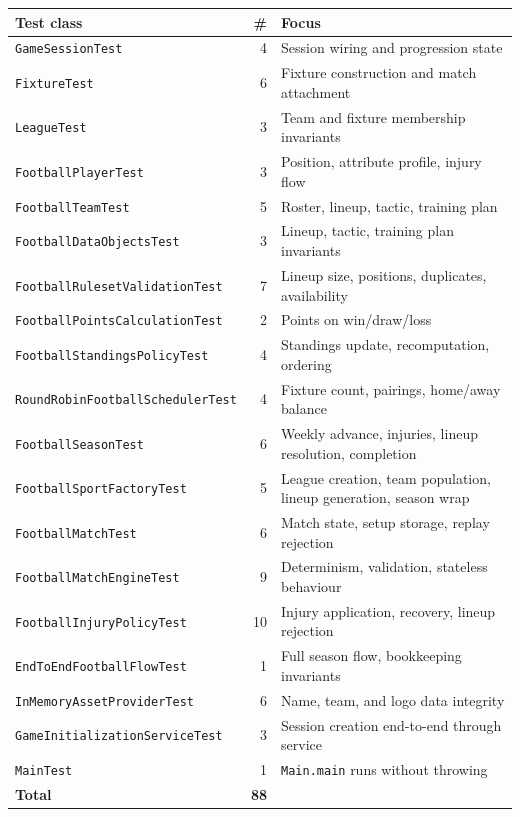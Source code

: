\documentclass[11pt, a4paper]{article}
\newcommand{\code}[1]{\texttt{#1}}
\begin{document}
\begin{longtable}{lrl}
    \toprule
    \textbf{Test class} & \textbf{\#} & \textbf{Focus} \\
    \midrule
    \endhead
    \code{GameSessionTest}                  & 4  & Session wiring and progression state \\
    \code{FixtureTest}                      & 6  & Fixture construction and match attachment \\
    \code{LeagueTest}                       & 3  & Team and fixture membership invariants \\
    \code{FootballPlayerTest}               & 3  & Position, attribute profile, injury flow \\
    \code{FootballTeamTest}                 & 5  & Roster, lineup, tactic, training plan \\
    \code{FootballDataObjectsTest}          & 3  & Lineup, tactic, training plan invariants \\
    \code{FootballRulesetValidationTest}    & 7  & Lineup size, positions, duplicates, availability \\
    \code{FootballPointsCalculationTest}    & 2  & Points on win/draw/loss \\
    \code{FootballStandingsPolicyTest}      & 4  & Standings update, recomputation, ordering \\
    \code{RoundRobinFootballSchedulerTest}  & 4  & Fixture count, pairings, home/away balance \\
    \code{FootballSeasonTest}               & 6  & Weekly advance, injuries, lineup resolution, completion \\
    \code{FootballSportFactoryTest}         & 5  & League creation, team population, lineup generation, season wrap \\
    \code{FootballMatchTest}                & 6  & Match state, setup storage, replay rejection \\
    \code{FootballMatchEngineTest}          & 9  & Determinism, validation, stateless behaviour \\
    \code{FootballInjuryPolicyTest}         & 10 & Injury application, recovery, lineup rejection \\
    \code{EndToEndFootballFlowTest}         & 1  & Full season flow, bookkeeping invariants \\
    \code{InMemoryAssetProviderTest}        & 6  & Name, team, and logo data integrity \\
    \code{GameInitializationServiceTest}    & 3  & Session creation end-to-end through service \\
    \code{MainTest}                         & 1  & \code{Main.main} runs without throwing \\
    \midrule
    \textbf{Total}                          & \textbf{88} & \\
    \bottomrule
\end{longtable}
\end{document}
